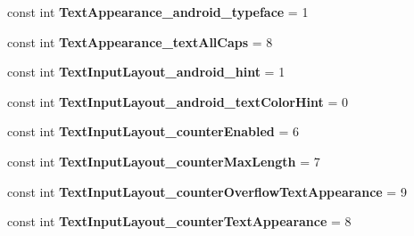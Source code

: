 \begin{DoxyCompactItemize}
const int {\bfseries Text\+Appearance\+\_\+android\+\_\+typeface} = 1
\item 
\mbox{\label{class_pinned_app_1_1_droid_1_1_resource_1_1_styleable_aff40aad253bb641224f79a8f583bf39d}} 
const int {\bfseries Text\+Appearance\+\_\+text\+All\+Caps} = 8
\item 
\mbox{\label{class_pinned_app_1_1_droid_1_1_resource_1_1_styleable_a72b57956de2b4d753da79c0835214e5c}} 
const int {\bfseries Text\+Input\+Layout\+\_\+android\+\_\+hint} = 1
\item 
\mbox{\label{class_pinned_app_1_1_droid_1_1_resource_1_1_styleable_ae785cd870ab554236d7b03c22e8b03f2}} 
const int {\bfseries Text\+Input\+Layout\+\_\+android\+\_\+text\+Color\+Hint} = 0
\item 
\mbox{\label{class_pinned_app_1_1_droid_1_1_resource_1_1_styleable_ad680bff4d8d7607ca01a1878535e23d2}} 
const int {\bfseries Text\+Input\+Layout\+\_\+counter\+Enabled} = 6
\item 
\mbox{\label{class_pinned_app_1_1_droid_1_1_resource_1_1_styleable_ae05f9f8ae45428465cd70dd93e1a8725}} 
const int {\bfseries Text\+Input\+Layout\+\_\+counter\+Max\+Length} = 7
\item 
\mbox{\label{class_pinned_app_1_1_droid_1_1_resource_1_1_styleable_a7aeaaeeb372fa32ba86abba4da385921}} 
const int {\bfseries Text\+Input\+Layout\+\_\+counter\+Overflow\+Text\+Appearance} = 9
\item 
\mbox{\label{class_pinned_app_1_1_droid_1_1_resource_1_1_styleable_a04772823ea8f5fe13395a0c7a3456ef3}} 
const int {\bfseries Text\+Input\+Layout\+\_\+counter\+Text\+Appearance} = 8
\item 
\mbox{\label{class_pinned_app_1_1_droid_1_1_resource_1_1_styleable_af1651c84a25c48d45011fbd256430931}} 

\end{DoxyCompactItemize}
